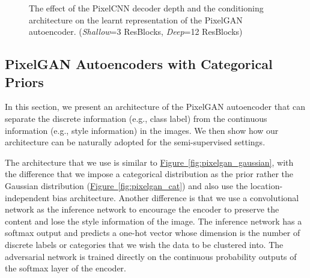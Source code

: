 \documentclass{article}
\newcommand{\myfig}[1]{\hyperref[fig:#1]{Figure~\ref*{fig:#1}}}
\begin{document}
\begin{figure}[t]
\centering
\hspace*{0.3cm}
\hspace{-.15cm}
\hspace*{0.3cm}
\hspace{-.15cm}
\hspace*{0.3cm}
\hspace{-.15cm}
\hspace*{0.3cm}
\vspace{-.3cm}
\caption{\label{fig:mnist_code} The effect of the PixelCNN decoder depth and the conditioning architecture on the learnt representation of the PixelGAN autoencoder. (\emph{Shallow}=3 ResBlocks, \emph{Deep}=12 ResBlocks)}
\end{figure}




\subsection{PixelGAN Autoencoders with Categorical Priors}\label{sec:pixelgan_cat}




In this section, we present an architecture of the PixelGAN autoencoder that can separate the discrete information (e.g., class label) from the continuous information (e.g., style information) in the images. 
We then show how our architecture can be naturally adopted for the semi-supervised settings.

The architecture that we use is similar to \myfig{pixelgan_gaussian}, with the difference that we impose a categorical distribution as the prior rather the Gaussian distribution (\myfig{pixelgan_cat}) and also use the location-independent bias architecture. Another difference is that we use a convolutional network as the inference network  to encourage the encoder to preserve the content and lose the style information of the image. The inference network has a softmax output and predicts a one-hot vector whose dimension is the number of discrete labels or categories that we wish the data to be clustered into. The adversarial network is trained directly on the continuous probability outputs of the softmax layer of the encoder. 
\end{document}
